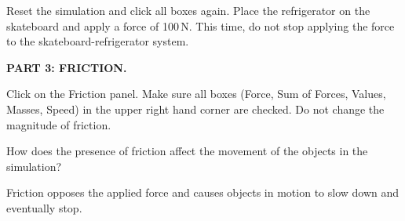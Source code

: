 \documentclass[../main-physics-problems.tex]{subfiles}
\begin{document}
\begin{questions}
\question
Reset the simulation and click all boxes again. Place the refrigerator on the skateboard and apply a force of 100\,N. This time, do not stop applying the force to the skateboard-refrigerator system. 


\begin{EnvUplevel}
    \textbf{PART 3: FRICTION.}

    Click on the Friction panel. Make sure all boxes (Force, Sum of Forces, Values, Masses, Speed) in the upper right hand corner are checked. Do not change the magnitude of friction.
\end{EnvUplevel}

\question
How does the presence of friction affect the movement of the objects in the simulation?

\begin{solution}
    Friction opposes the applied force and causes objects in motion to slow down and eventually stop.
\end{solution}


\end{questions}
\end{document}
